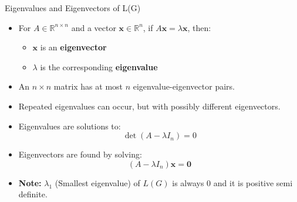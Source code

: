 \documentclass[aspectratio=169]{beamer}
\begin{document}
\begin{frame}{Eigenvalues and Eigenvectors of L(G)}

\begin{itemize}
    \item For \( A \in \mathbb{R}^{n \times n} \) and a vector \( \mathbf{x} \in \mathbb{R}^n \), if \( A \mathbf{x} = \lambda \mathbf{x} \), then:
    \begin{itemize}
        \item \( \mathbf{x} \) is an \textbf{eigenvector}
        \item \( \lambda \) is the corresponding \textbf{eigenvalue}
    \end{itemize}

    \item An \( n \times n \) matrix has at most \( n \) eigenvalue-eigenvector pairs.

    \item Repeated eigenvalues can occur, but with possibly different eigenvectors.

    \item Eigenvalues are solutions to:
    \[
    \det(A - \lambda I_n) = 0
    \]

    \item Eigenvectors are found by solving:
    \[
    (A - \lambda I_n) \mathbf{x} = \mathbf{0}
    \]
    \item \textbf{Note:} \( \lambda_{1} \) (Smallest eigenvalue) of \( L(G) \) is always 0 and it is positive semi definite.
\end{itemize}
\end{frame}
\end{document}
